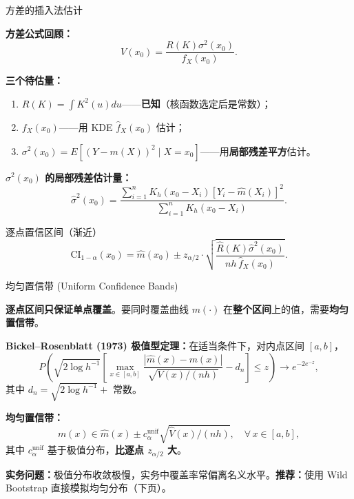 \documentclass[aspectratio=169, 10pt]{beamer}
\begin{document}
\begin{frame}{方差的插入法估计}

  \textbf{方差公式回顾：}
  \[
    V(x_0) = \frac{R(K)\sigma^2(x_0)}{f_X(x_0)}.
  \]

  \textbf{三个待估量：}
  \begin{enumerate}
    \item $R(K) = \int K^2(u)du$——\textbf{已知}（核函数选定后是常数）；
    \item $f_X(x_0)$——用 KDE $\hat f_X(x_0)$ 估计；
    \item $\sigma^2(x_0) = E[(Y - m(X))^2\mid X=x_0]$——用\textbf{局部残差平方}估计。
  \end{enumerate}

  \textbf{$\sigma^2(x_0)$ 的局部残差估计量：}
  \[
    \hat\sigma^2(x_0) = \frac{\sum_{i=1}^n K_h(x_0-X_i)[Y_i - \hat m(X_i)]^2}{\sum_{i=1}^n K_h(x_0-X_i)}.
  \]

  \begin{definitionbox}{逐点置信区间（渐近）}
    \[
      \text{CI}_{1-\alpha}(x_0) = \hat m(x_0) \pm z_{\alpha/2}\cdot \sqrt{\frac{\hat R(K)\hat\sigma^2(x_0)}{nh\,\hat f_X(x_0)}}.
    \]
  \end{definitionbox}

\end{frame}


\begin{frame}{均匀置信带 (Uniform Confidence Bands)}

  \textbf{逐点区间只保证单点覆盖}。要同时覆盖曲线 $m(\cdot)$ 在\textbf{整个区间}上的值，需要\textbf{均匀置信带}。

  \begin{highlightbox}
    \textbf{Bickel--Rosenblatt (1973) 极值型定理：}在适当条件下，对内点区间 $[a,b]$，
    \[
      P\!\left(\sqrt{2\log h^{-1}}\left[\max_{x\in[a,b]}\frac{|\hat m(x) - m(x)|}{\sqrt{V(x)/(nh)}} - d_n\right] \leq z\right)
      \to e^{-2e^{-z}},
    \]
    其中 $d_n = \sqrt{2\log h^{-1}} + $ 常数。
  \end{highlightbox}

  \vspace{0.3em}

  \textbf{均匀置信带：}
  \[
    m(x) \in \hat m(x) \pm c_\alpha^{\text{unif}}\sqrt{\hat V(x)/(nh)},\quad \forall\, x\in [a,b],
  \]
  其中 $c_\alpha^{\text{unif}}$ 基于极值分布，\textbf{比逐点 $z_{\alpha/2}$ 大}。

  \begin{keybox}
    \textbf{实务问题：}极值分布收敛极慢，实务中覆盖率常偏离名义水平。\textbf{推荐：}使用 Wild Bootstrap 直接模拟均匀分布（下页）。
  \end{keybox}

\end{frame}
\end{document}
